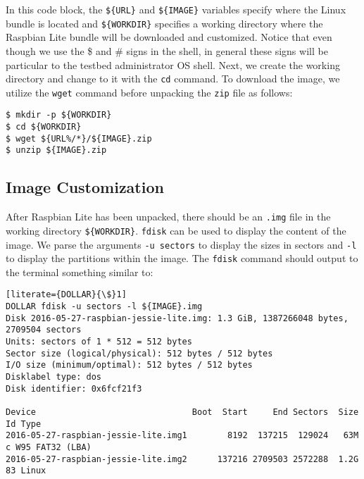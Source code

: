 In this code block, the \texttt{\$\{URL\}} and \texttt{\$\{IMAGE\}}
variables specify where the Linux bundle is located and
\texttt{\$\{WORKDIR\}} specifies a working directory where the Raspbian
Lite bundle will be downloaded and customized. Notice that even though we
use the \$ and \# signs in the shell, in general these signs will be
particular to the testbed administrator \ac{OS} shell. Next, we create
the working directory and change to it with the \texttt{cd} command. To
download the image, we utilize the \texttt{wget} command before unpacking
the \texttt{zip} file as follows:



\begin{lstlisting}[]
$ mkdir -p ${WORKDIR}
$ cd ${WORKDIR}
$ wget ${URL%/*}/${IMAGE}.zip
$ unzip ${IMAGE}.zip
\end{lstlisting}
\FloatBarrier
\vspace{-5mm}


\subsection{Image Customization}

After Raspbian Lite has been unpacked, there should be an \texttt{.img}
file in the working directory \texttt{\$\{WORKDIR\}}. \texttt{fdisk} can
be used to display the content of the image. We parse the arguments \texttt{-u sectors}
to display the sizes in sectors and \texttt{-l} to display the partitions
within the image. The \texttt{fdisk} command should output to the terminal
something similar to:

\begin{lstlisting}[literate={DOLLAR}{\$}1]
DOLLAR fdisk -u sectors -l ${IMAGE}.img
Disk 2016-05-27-raspbian-jessie-lite.img: 1.3 GiB, 1387266048 bytes, 2709504 sectors
Units: sectors of 1 * 512 = 512 bytes
Sector size (logical/physical): 512 bytes / 512 bytes
I/O size (minimum/optimal): 512 bytes / 512 bytes
Disklabel type: dos
Disk identifier: 0x6fcf21f3

Device                               Boot  Start     End Sectors  Size Id Type
2016-05-27-raspbian-jessie-lite.img1        8192  137215  129024   63M  c W95 FAT32 (LBA)
2016-05-27-raspbian-jessie-lite.img2      137216 2709503 2572288  1.2G 83 Linux
\end{lstlisting}
\FloatBarrier

